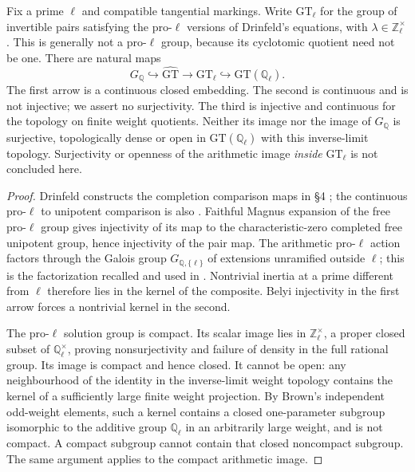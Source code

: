 Fix a prime $\ell$ and compatible tangential markings.  Write
$\mathrm{GT}_{\ell}$ for the group of invertible pairs satisfying the
pro-$\ell$ versions of Drinfeld's equations, with
$\lambda\in\mathbb Z_\ell^{\times}$.  This is generally not a
pro-$\ell$ group, because its cyclotomic quotient need not be one.
There are natural maps
\[
 G_{\mathbb Q}\hookrightarrow\widehat{\mathrm{GT}}
   \longrightarrow\mathrm{GT}_{\ell}
   \hookrightarrow\mathrm{GT}(\mathbb Q_\ell).
\]
The first arrow is a continuous closed embedding.  The second is
continuous and is not injective; we assert no surjectivity.
The third is injective and continuous for the topology on finite weight
quotients.  Neither its image nor the image of $G_{\mathbb Q}$ is
surjective, topologically dense or open in
$\mathrm{GT}(\mathbb Q_\ell)$ with this inverse-limit topology.
Surjectivity or openness of the arithmetic image \emph{inside}
$\mathrm{GT}_{\ell}$ is not concluded here.
\begin{proof}
Drinfeld constructs the completion comparison maps in \S4
\citep{Drinfeld1990}; the continuous pro-$\ell$ to unipotent
comparison is also \citet[Theorem~A.6 and Corollary~A.10]{HainMatsumoto2003}.
Faithful Magnus expansion of the free pro-$\ell$ group gives
injectivity of its map to the characteristic-zero completed free
unipotent group, hence injectivity of the pair map.
The arithmetic pro-$\ell$ action factors through the Galois group
$G_{\mathbb Q,\{\ell\}}$ of extensions unramified outside $\ell$;
this is the factorization recalled and used in
\citet[Introduction and \S8.4]{HainMatsumoto2003}.
Nontrivial inertia at a prime different from $\ell$ therefore lies in
the kernel of the composite.  Belyi injectivity in the first arrow
forces a nontrivial kernel in the second.

The pro-$\ell$ solution group is compact.  Its scalar image lies in
$\mathbb Z_\ell^{\times}$, a proper closed subset of
$\mathbb Q_\ell^{\times}$, proving nonsurjectivity and failure of
density in the full rational group.  Its image is compact and hence
closed.  It cannot be open: any neighbourhood of the identity in the
inverse-limit weight topology contains the kernel of a sufficiently
large finite weight projection.  By Brown's independent odd-weight
elements, such a kernel contains a closed one-parameter subgroup
isomorphic to the additive group $\mathbb Q_\ell$ in an arbitrarily
large weight, and is not compact.  A compact subgroup cannot contain
that closed noncompact subgroup.  The same argument applies to the
compact arithmetic image.
\end{proof}

